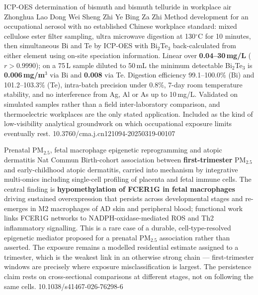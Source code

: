 \documentclass[10pt]{article}
\begin{document}
{ICP-OES determination of bismuth and bismuth telluride in workplace air}
{Zhonghua Lao Dong Wei Sheng Zhi Ye Bing Za Zhi}
{Method development for an occupational aerosol with no established Chinese workplace
standard: mixed cellulose ester filter sampling, ultra microwave digestion at 130$^\circ$C for
10 minutes, then simultaneous Bi and Te by ICP-OES with Bi$_2$Te$_3$ back-calculated from
either element using on-site speciation information. Linear over \textbf{0.04--30\,mg/L}
($r>0.9990$); on a 75\,L sample diluted to 50\,mL the minimum detectable Bi$_2$Te$_3$ is
\textbf{0.006\,mg/m$^3$} via Bi and \textbf{0.008} via Te. Digestion efficiency
99.1--100.0\% (Bi) and 101.2--103.3\% (Te), intra-batch precision under 0.8\%, 7-day room
temperature stability, and no interference from Ag, Al or As up to 10\,mg/L. Validated on
simulated samples rather than a field inter-laboratory comparison, and thermoelectric
workplaces are the only stated application. Included as the kind of low-visibility analytical
groundwork on which occupational exposure limits eventually rest.}
{10.3760/cma.j.cn121094-20250319-00107}


{Prenatal PM$_{2.5}$, fetal macrophage epigenetic reprogramming and atopic dermatitis}
{Nat Commun}
{Birth-cohort association between \textbf{first-trimester} PM$_{2.5}$ and early-childhood
atopic dermatitis, carried into mechanism by integrative multi-omics including single-cell
profiling of placenta and fetal immune cells. The central finding is \textbf{hypomethylation
of FCER1G in fetal macrophages} driving sustained overexpression that persists across
developmental stages and re-emerges in M2 macrophages of AD skin and peripheral blood;
functional work links FCER1G networks to NADPH-oxidase-mediated ROS and Th2 inflammatory
signalling. This is a rare case of a durable, cell-type-resolved epigenetic mediator proposed
for a prenatal PM$_{2.5}$ association rather than asserted. The exposure remains a modelled
residential estimate assigned to a trimester, which is the weakest link in an otherwise strong
chain --- first-trimester windows are precisely where exposure misclassification is largest.
The persistence claim rests on cross-sectional comparisons at different stages, not on
following the same cells.}
{10.1038/s41467-026-76298-6}
\end{document}
